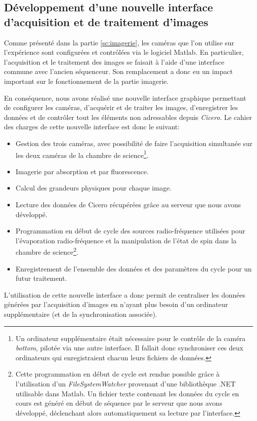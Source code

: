 \subsection{Développement d'une nouvelle interface d'acquisition et de traitement d'images}
Comme présenté dans la partie \ref{sc:imagerie}, les caméras que l'on utilise sur l'expérience sont configurées et contrôlées via le logiciel Matlab. En particulier, l'acquisition et le traitement des images se faisait à l'aide d'une interface commune avec l'ancien séquenceur. Son remplacement a donc eu un impact important sur le fonctionnement de la partie imagerie. 

En conséquence, nous avons réalisé une nouvelle interface graphique permettant de configurer les caméras, d'acquérir et de traiter les images, d'enregistrer les données et de contrôler tout les éléments non adressables depuis \emph{Cicero}. Le cahier des charges de cette nouvelle interface est donc le suivant:
\begin{itemize}
\item[\textendash] Gestion des trois caméras, avec possibilité de faire l'acquisition simultanée sur les deux caméras de la chambre de science\footnote{Un ordinateur supplémentaire était nécessaire pour le contrôle de la caméra \textit{bottom}, pilotée via une autre interface. Il fallait donc synchroniser ces deux ordinateurs qui enregistraient chacun leurs fichiers de données.}.
\item[\textendash] Imagerie par absorption et par fluorescence.
\item[\textendash] Calcul des grandeurs physiques pour chaque image.
\item[\textendash] Lecture des données de Cicero récupérées grâce au serveur que nous avons développé.
\item[\textendash] Programmation en début de cycle des sources radio-fréquence utilisées pour l'évaporation radio-fréquence et la manipulation de l'état de spin dans la chambre de science\footnote{Cette programmation en début de cycle est rendue possible grâce à l'utilisation d'un \emph{FileSystemWatcher} provenant d'une bibliothèque .NET utilisable dans Matlab. Un fichier texte contenant les données du cycle en cours est généré en début de séquence par le serveur que nous avons développé, déclenchant alors automatiquement sa lecture par l'interface.}.
\item[\textendash] Enregistrement de l'ensemble des données et des paramètres du cycle pour un futur traitement.
\end{itemize}
L'utilisation de cette nouvelle interface a donc permit de centraliser les données générées par l'acquisition d'images en n'ayant plus besoin d'un ordinateur supplémentaire (et de la synchronisation associée). 











